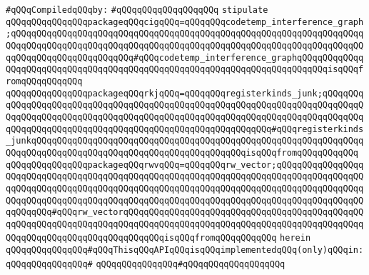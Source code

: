 \newline
\verb|#qQQqCompiledqQQqby:|\newline
\verb|#qQQqqQQqqQQqqQQqqQQq|\newline
\newline
\verb|stipulate|\newline
\verb|qQQqqQQqqQQqqQQqpackageqQQqcigqQQq=qQQqqQQqcodetemp_interference_graph;qQQqqQQqqQQqqQQqqQQqqQQqqQQqqQQqqQQqqQQqqQQqqQQqqQQqqQQqqQQqqQQqqQQqqQQqqQQqqQQqqQQqqQQqqQQqqQQqqQQqqQQqqQQqqQQqqQQqqQQqqQQqqQQqqQQqqQQqqQQqqQQqqQQqqQQqqQQqqQQqqQQq#qQQqcodetemp_interference_graphqQQqqQQqqQQqqQQqqQQqqQQqqQQqqQQqqQQqqQQqqQQqqQQqqQQqqQQqqQQqqQQqqQQqqQQqqQQqisqQQqfromqQQqqQQqqQQq|\newline
\verb|qQQqqQQqqQQqqQQqpackageqQQqrkjqQQq=qQQqqQQqregisterkinds_junk;qQQqqQQqqQQqqQQqqQQqqQQqqQQqqQQqqQQqqQQqqQQqqQQqqQQqqQQqqQQqqQQqqQQqqQQqqQQqqQQqqQQqqQQqqQQqqQQqqQQqqQQqqQQqqQQqqQQqqQQqqQQqqQQqqQQqqQQqqQQqqQQqqQQqqQQqqQQqqQQqqQQqqQQqqQQqqQQqqQQqqQQqqQQqqQQqqQQqqQQq#qQQqregisterkinds_junkqQQqqQQqqQQqqQQqqQQqqQQqqQQqqQQqqQQqqQQqqQQqqQQqqQQqqQQqqQQqqQQqqQQqqQQqqQQqqQQqqQQqqQQqqQQqqQQqqQQqqQQqqQQqqQQqisqQQqfromqQQqqQQqqQQq|\newline
\verb|qQQqqQQqqQQqqQQqpackageqQQqrwvqQQq=qQQqqQQqrw_vector;qQQqqQQqqQQqqQQqqQQqqQQqqQQqqQQqqQQqqQQqqQQqqQQqqQQqqQQqqQQqqQQqqQQqqQQqqQQqqQQqqQQqqQQqqQQqqQQqqQQqqQQqqQQqqQQqqQQqqQQqqQQqqQQqqQQqqQQqqQQqqQQqqQQqqQQqqQQqqQQqqQQqqQQqqQQqqQQqqQQqqQQqqQQqqQQqqQQqqQQqqQQqqQQqqQQqqQQqqQQqqQQqqQQqqQQqqQQq#qQQqrw_vectorqQQqqQQqqQQqqQQqqQQqqQQqqQQqqQQqqQQqqQQqqQQqqQQqqQQqqQQqqQQqqQQqqQQqqQQqqQQqqQQqqQQqqQQqqQQqqQQqqQQqqQQqqQQqqQQqqQQqqQQqqQQqqQQqqQQqqQQqqQQqqQQqqQQqisqQQqfromqQQqqQQqqQQq|\newline
\verb|herein|\newline
\newline
\verb|qQQqqQQqqQQqqQQq#qQQqThisqQQqAPIqQQqisqQQqimplementedqQQq(only)qQQqin:|\newline
\verb|qQQqqQQqqQQqqQQq#|\newline
\verb|qQQqqQQqqQQqqQQq#qQQqqQQqqQQqqQQqqQQq|\newline
